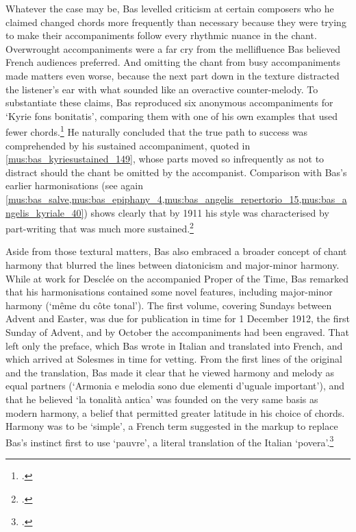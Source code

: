Whatever the case may be, Bas levelled criticism at certain composers who he claimed changed chords more frequently than necessary because they were trying to make their accompaniments follow every rhythmic nuance in the chant.
Overwrought accompaniments were a far cry from the mellifluence Bas believed French audiences preferred.
And omitting the chant from busy accompaniments made matters even worse, because the next part down in the texture distracted the listener's ear with what sounded like an overactive counter-melody.
To substantiate these claims, Bas reproduced six anonymous accompaniments for `Kyrie fons bonitatis', comparing them with one of his own examples that used fewer chords.\footnote{\cite[143--9]{Bassimplicitedansaccompagnement1911a}.}
He naturally concluded that the true path to success was comprehended by his sustained accompaniment, quoted in  \cref{mus:bas_kyriesustained_149}, whose parts moved so infrequently as not to distract should the chant be omitted by the accompanist.
Comparison with Bas's earlier harmonisations (see again \cref{mus:bas_salve,mus:bas_epiphany_4,mus:bas_angelis_repertorio_15,mus:bas_angelis_kyriale_40}) shows clearly that by 1911 his style was characterised by part-writing that was much more sustained.\footcite[10]{BasKyrialeseuordinarium1906}
\nowidow[2]

Aside from those textural matters, Bas also embraced a broader concept of chant \mbox{harmony} that blurred the lines between diatonicism and major-minor harmony.
While at work for Desclée on the accompanied Proper of the Time, Bas remarked that his harmonisations contained some novel features, including major-minor harmony (`même du côte tonal').
The first volume, covering Sundays between Advent and Easter, was due for publication in time for 1 December 1912, the first Sunday of Advent, and by October the accompaniments had been engraved.
That left only the preface, which Bas wrote in Italian and translated into French, and which arrived at Solesmes in time for vetting.
From the first lines of the original and the translation, Bas made it clear that he viewed harmony and melody as equal partners (`Armonia e melodia sono due elementi d'uguale important'), and that he believed `la tonalità antica' was founded on the very same basis as modern harmony, a belief that permitted greater latitude in his choice of chords.
Harmony was to be `simple', a French term suggested in the markup to replace Bas's instinct first to use `pauvre', a literal translation of the Italian `povera'.\footnote{\covid{}\cite{BasPropriumtemporeAdventu1912}.}

